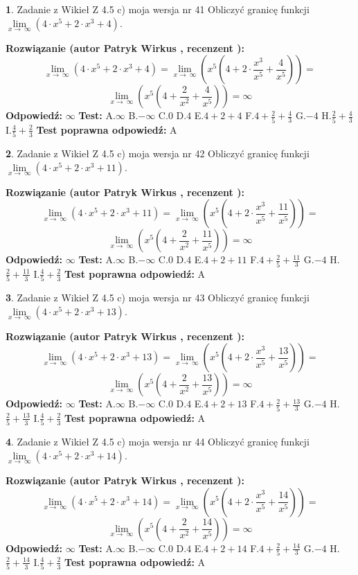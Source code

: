 \documentclass[12pt, a4paper]{article}
\theoremstyle{definition} %
\newtheorem{zad}{}
\newcommand{\zadStart}[1]{\begin{zad}#1\newline}
\newcommand{\zadStop}{\end{zad}}
\newcommand{\rozwStart}[2]{\noindent \textbf{Rozwiązanie (autor #1 , recenzent #2): }\newline}
\newcommand{\rozwStop}{\newline}
\newcommand{\odpStart}{\noindent \textbf{Odpowiedź:}\newline}
\newcommand{\odpStop}{\newline}
\newcommand{\testStart}{\noindent \textbf{Test:}\newline}
\newcommand{\testStop}{\newline}
\newcommand{\kluczStart}{\noindent \textbf{Test poprawna odpowiedź:}\newline}
\newcommand{\kluczStop}{\newline}
\begin{document}
\zadStart{Zadanie z Wikieł Z 4.5 c) moja wersja nr 41}
Obliczyć granicę funkcji  $\lim\limits_{x\to\ \infty}(4 \cdot x^{5}+2 \cdot x^{3}+4)$.
\zadStop
\rozwStart{Patryk Wirkus}{}
$$\lim\limits_{x\to\ \infty}(4 \cdot x^{5}+2 \cdot x^{3}+4) = \lim\limits_{x\to\ \infty}(x^{5}(4 +2 \cdot \frac{x^{3}}{x^{5}}+\frac{4}{x^{5}})) =$$ $$\lim\limits_{x\to\ \infty}(x^{5}(4 +\frac{2}{x^{2}}+\frac{4}{x^{5}})) =\infty$$
\rozwStop
\odpStart
$\infty$
\odpStop
\testStart
A.$\infty$ B.$-\infty$ C.$0$ D.$4$ E.$4 + 2 + 4$
F.$4+\frac{2}{5}+\frac{4}{3}$ G.$-4$
H.$\frac{2}{5}+\frac{4}{3}$
I.$\frac{4}{5}+\frac{2}{3}$
\testStop
\kluczStart
A
\kluczStop



\zadStart{Zadanie z Wikieł Z 4.5 c) moja wersja nr 42}
Obliczyć granicę funkcji  $\lim\limits_{x\to\ \infty}(4 \cdot x^{5}+2 \cdot x^{3}+11)$.
\zadStop
\rozwStart{Patryk Wirkus}{}
$$\lim\limits_{x\to\ \infty}(4 \cdot x^{5}+2 \cdot x^{3}+11) = \lim\limits_{x\to\ \infty}(x^{5}(4 +2 \cdot \frac{x^{3}}{x^{5}}+\frac{11}{x^{5}})) =$$ $$\lim\limits_{x\to\ \infty}(x^{5}(4 +\frac{2}{x^{2}}+\frac{11}{x^{5}})) =\infty$$
\rozwStop
\odpStart
$\infty$
\odpStop
\testStart
A.$\infty$ B.$-\infty$ C.$0$ D.$4$ E.$4 + 2 + 11$
F.$4+\frac{2}{5}+\frac{11}{3}$ G.$-4$
H.$\frac{2}{5}+\frac{11}{3}$
I.$\frac{4}{5}+\frac{2}{3}$
\testStop
\kluczStart
A
\kluczStop



\zadStart{Zadanie z Wikieł Z 4.5 c) moja wersja nr 43}
Obliczyć granicę funkcji  $\lim\limits_{x\to\ \infty}(4 \cdot x^{5}+2 \cdot x^{3}+13)$.
\zadStop
\rozwStart{Patryk Wirkus}{}
$$\lim\limits_{x\to\ \infty}(4 \cdot x^{5}+2 \cdot x^{3}+13) = \lim\limits_{x\to\ \infty}(x^{5}(4 +2 \cdot \frac{x^{3}}{x^{5}}+\frac{13}{x^{5}})) =$$ $$\lim\limits_{x\to\ \infty}(x^{5}(4 +\frac{2}{x^{2}}+\frac{13}{x^{5}})) =\infty$$
\rozwStop
\odpStart
$\infty$
\odpStop
\testStart
A.$\infty$ B.$-\infty$ C.$0$ D.$4$ E.$4 + 2 + 13$
F.$4+\frac{2}{5}+\frac{13}{3}$ G.$-4$
H.$\frac{2}{5}+\frac{13}{3}$
I.$\frac{4}{5}+\frac{2}{3}$
\testStop
\kluczStart
A
\kluczStop



\zadStart{Zadanie z Wikieł Z 4.5 c) moja wersja nr 44}
Obliczyć granicę funkcji  $\lim\limits_{x\to\ \infty}(4 \cdot x^{5}+2 \cdot x^{3}+14)$.
\zadStop
\rozwStart{Patryk Wirkus}{}
$$\lim\limits_{x\to\ \infty}(4 \cdot x^{5}+2 \cdot x^{3}+14) = \lim\limits_{x\to\ \infty}(x^{5}(4 +2 \cdot \frac{x^{3}}{x^{5}}+\frac{14}{x^{5}})) =$$ $$\lim\limits_{x\to\ \infty}(x^{5}(4 +\frac{2}{x^{2}}+\frac{14}{x^{5}})) =\infty$$
\rozwStop
\odpStart
$\infty$
\odpStop
\testStart
A.$\infty$ B.$-\infty$ C.$0$ D.$4$ E.$4 + 2 + 14$
F.$4+\frac{2}{5}+\frac{14}{3}$ G.$-4$
H.$\frac{2}{5}+\frac{14}{3}$
I.$\frac{4}{5}+\frac{2}{3}$
\testStop
\kluczStart
A
\kluczStop
\end{document}
